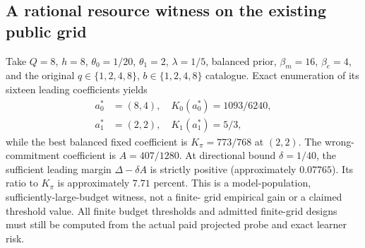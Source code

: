 \subsection{A rational resource witness on the existing public grid}
Take $Q=8$, $h=8$, $\theta_0=1/20$, $\theta_1=2$, $\lambda=1/5$,
balanced prior, $\beta_m=16$, $\beta_e=4$, and the original
$q\in\{1,2,4,8\}$, $b\in\{1,2,4,8\}$ catalogue.
Exact enumeration of its sixteen leading coefficients yields
\begin{align*}
a_0^*&=(8,4),\quad K_0(a_0^*)=1093/6240,\\
a_1^*&=(2,2),\quad K_1(a_1^*)=5/3,
\end{align*}
while the best balanced fixed coefficient is $K_\pi=773/768$ at $(2,2)$.
The wrong-commitment coefficient is $A=407/1280$.
At directional bound $\delta=1/40$, the sufficient leading margin
$\Delta-\delta A$ is strictly positive (approximately $0.07765$).
Its ratio to $K_\pi$ is approximately $7.71$ percent.
This is a model-population, sufficiently-large-budget witness, not a finite-
grid empirical gain or a claimed threshold value.
All finite budget thresholds and admitted finite-grid designs must still be
computed from the actual paid projected probe and exact learner risk.
